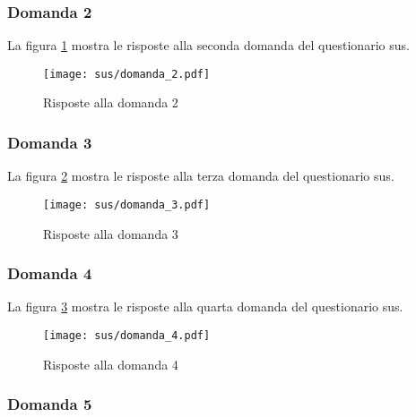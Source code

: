 \subsubsection*{Domanda 2}

\vspace{5pt}
\begin{minipage}{\textwidth}
  \par\noindent La figura \ref{fig:sus_q2} mostra le risposte alla seconda domanda del questionario \gls{sus}.
  \begin{figure}[H]
    \centering
    \texttt{[image: sus/domanda\_2.pdf]}
    \caption{Risposte alla domanda 2}
    \label{fig:sus_q2}
  \end{figure}
\end{minipage}

\subsubsection*{Domanda 3}

\vspace{5pt}
\begin{minipage}{\textwidth}
  \par\noindent La figura \ref{fig:sus_q3} mostra le risposte alla terza domanda del questionario \gls{sus}.
  \begin{figure}[H]
    \centering
    \texttt{[image: sus/domanda\_3.pdf]}
    \caption{Risposte alla domanda 3}
    \label{fig:sus_q3}
  \end{figure}
\end{minipage}

\subsubsection*{Domanda 4}

\vspace{5pt}
\begin{minipage}{\textwidth}
  \par\noindent La figura \ref{fig:sus_q4} mostra le risposte alla quarta domanda del questionario \gls{sus}.
  \begin{figure}[H]
    \centering
    \texttt{[image: sus/domanda\_4.pdf]}
    \caption{Risposte alla domanda 4}
    \label{fig:sus_q4}
  \end{figure}
\end{minipage}

\subsubsection*{Domanda 5}

